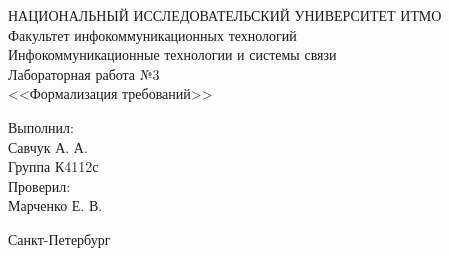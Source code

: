 \begin{titlepage}

  \begin{center}
    НАЦИОНАЛЬНЫЙ ИССЛЕДОВАТЕЛЬСКИЙ УНИВЕРСИТЕТ ИТМО\\[0.1cm]
    Факультет инфокоммуникационных технологий\\
    Инфокоммуникационные технологии и системы связи\\[5cm]

    {\Large Лабораторная работа №3}\\[0.1cm]
    \noindent<<Формализация требований>>\\[3cm]
  \end{center}

  \begin{minipage}{0.65\linewidth}
    \hspace{\fill}
  \end{minipage}
  \begin{minipage}{0.25\linewidth}
    Выполнил:\\
    Савчук А. А.\\
    Группа К4112с \\

    Проверил:\\
    Марченко Е. В.
  \end{minipage}

  \vfill

  \begin{center}
    Санкт-Петербург\\
    \the\year
  \end{center}

\end{titlepage}
